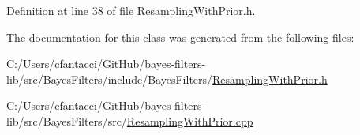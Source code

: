 Definition at line 38 of file Resampling\+With\+Prior.\+h.



The documentation for this class was generated from the following files\+:\begin{DoxyCompactItemize}
\item 
C\+:/\+Users/cfantacci/\+Git\+Hub/bayes-\/filters-\/lib/src/\+Bayes\+Filters/include/\+Bayes\+Filters/\mbox{\hyperlink{ResamplingWithPrior_8h}{Resampling\+With\+Prior.\+h}}\item 
C\+:/\+Users/cfantacci/\+Git\+Hub/bayes-\/filters-\/lib/src/\+Bayes\+Filters/src/\mbox{\hyperlink{ResamplingWithPrior_8cpp}{Resampling\+With\+Prior.\+cpp}}\end{DoxyCompactItemize}
